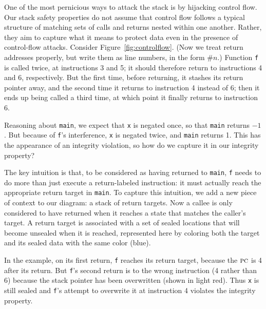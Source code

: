 \documentclass[acmsmall,review,anonymous]{acmart}\settopmatter{printfolios=true,printccs=false,printacmref=false}
\begin{document}
{\label{sec:controlflow} %

One of the most pernicious ways to attack the stack is by hijacking control flow.
Our stack safety properties do not assume that control flow follows a typical structure
of matching sets of calls and returns nested within one another.
Rather, they aim to capture what it means to protect data even in the presence of control-flow attacks.
Consider Figure~\ref{fig:controlflow}.
(Now we treat return addresses properly, but write them as line numbers, in the
form $\#n$.)
Function {\tt f} is called twice, at instructions 3 and 5; it should therefore return to instructions
4 and 6, respectively. But the first time, before returning, it stashes its
return pointer away, and the second time it returns to instruction 4 instead of 6; then it ends
up being called a third time, at which point it finally returns to instruction 6.

Reasoning about {\tt main}, we expect that {\tt x} is negated once, so that {\tt main} returns
$-1$. But because of {\tt f}'s interference, {\tt x} is negated twice, and {\tt main} returns 1.
This has the appearance of an integrity violation, so how do we capture it in our
integrity property?

The key intuition is that, to be considered as having returned to {\tt main}, {\tt f} needs
to do more than just execute a return-labeled instruction: it must actually reach the
appropriate return target in {\tt main}.
To capture this intuition, we add a new piece of context to our diagram:
a stack of return targets.  Now a callee is
only considered to have returned when it reaches a state that matches the caller's target.
A return target is associated with a set of sealed locations that will become unsealed
when it is reached, represented here by coloring both the target and its sealed data with the
same color (blue). 

In the example, on its first return, {\tt f} reaches its return target, because the
\(\textsc{pc}\) is 4 after its return. But {\tt f}'s second return is to the wrong instruction
(4 rather than 6) because the stack pointer has been overwritten (shown in light red).
Thus {\tt x} is still sealed and {\tt f}'s attempt to overwrite it at instruction 4
violates the integrity property.


}
\end{document}
